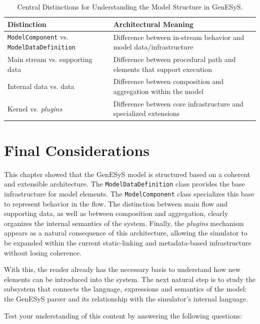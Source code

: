 \begin{table}[htbp]
 \centering
 \caption{Central Distinctions for Understanding the Model Structure in GenESyS.}
 \label{tab:cap8_distincoes_centrais}
 \small
 \begin{tabular}{|p{3.4cm}|p{6.9cm}|}
 \hline
 \textbf{Distinction} & \textbf{Architectural Meaning} \\
 \hline
 \texttt{ModelComponent} vs. \texttt{ModelDataDefinition} & Difference between in-stream behavior and model data/infrastructure \\
 \hline
 Main stream vs. supporting data & Difference between procedural path and elements that support execution \\
 \hline
 Internal data vs. data & Difference between composition and aggregation within the model \\
 \hline
 Kernel vs. \textit{plugins} & Difference between core infrastructure and specialized extensions \\
 \hline
 \end{tabular}
\end{table}

\section{Final Considerations}
\label{sec:cap8_consideracoes_finais}

This chapter showed that the GenESyS model is structured based on a coherent and extensible architecture. The \texttt{ModelDataDefinition} class provides the base infrastructure for model elements. The \texttt{ModelComponent} class specializes this base to represent behavior in the flow. The distinction between main flow and supporting data, as well as between composition and aggregation, clearly organizes the internal semantics of the system. Finally, the \textit{plugins} mechanism appears as a natural consequence of this architecture, allowing the simulator to be expanded within the current static-linking and metadata-based infrastructure without losing coherence.

With this, the reader already has the necessary basis to understand how new elements can be introduced into the system. The next natural step is to study the subsystem that connects the language, expressions and semantics of the model: the GenESyS parser and its relationship with the simulator's internal language.

Test your understanding of this content by answering the following questions:

